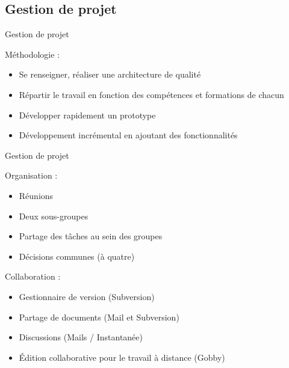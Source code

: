 \documentclass{beamer}
\begin{document}
	\subsection{Gestion de projet}
		\begin{frame}{Gestion de projet}
			\begin{block}{Méthodologie :}
			\begin{itemize}
			\item Se renseigner, réaliser une architecture de qualité
			\item Répartir le travail en fonction des compétences et formations de chacun
			\item Développer rapidement un prototype
			\item Développement incrémental en ajoutant des fonctionnalités
			\end{itemize}
			\end{block}
		\end{frame}
		
		\begin{frame}{Gestion de projet}
			\begin{block}{Organisation :}
			\begin{itemize}
				\item{Réunions}
				\item{Deux sous-groupes}
				\item{Partage des tâches au sein des groupes}
				\item{Décisions communes (à quatre)}
			\end{itemize}
			\end{block}
		
		\begin{block}{Collaboration :}
			\begin{itemize}
				\item{Gestionnaire de version (Subversion)}
				\item{Partage de documents (Mail et Subversion)}
				\item{Discussions (Mails / Instantanée)}
				\item{Édition collaborative pour le travail à distance (Gobby)}
			\end{itemize}
         \end{block}
		\end{frame}
		
\end{document}
